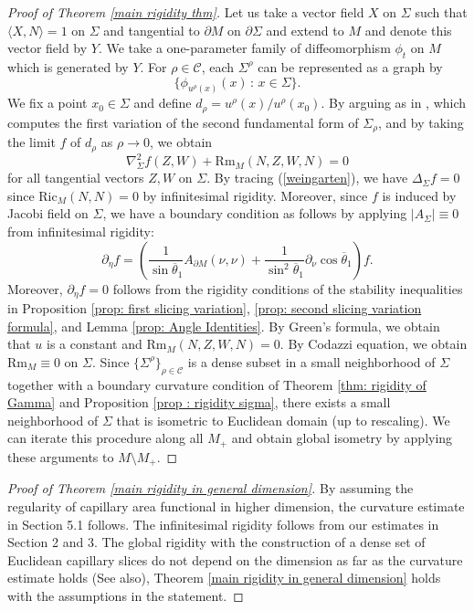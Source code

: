 \documentclass[11pt,letterpaper]{amsart}
\begin{document}
\begin{proof}[Proof of Theorem \ref{main rigidity thm}]
Let us take a vector field $X$ on $\Sigma$ such that $\langle X, N \rangle =1$ on $\Sigma$ and tangential to $\partial M$ on $\partial \Sigma$ and extend to $M$ and denote this vector field by $Y$. We take a one-parameter family of diffeomorphism $\phi_{t}$ on $M$ which is generated by $Y$. For $\rho \in \mathcal{C}$, each $\Sigma^{\rho}$ can be represented as a graph by
\begin{equation*}
    \{ \phi_{u^{\rho}(x)} (x) \, : \, x \in \Sigma\}.
\end{equation*}
We fix a point $x_{0} \in \Sigma$ and define $d_{\rho} = u^{\rho}(x)/ u^{\rho}(x_{0})$. By arguing as in \cite{liu20133}, which computes the first variation of the second fundamental form of $\Sigma_{\rho}$, and by taking the limit $f$ of $d_{\rho}$ as $\rho \rightarrow 0$, we obtain
\begin{equation} \label{weingarten}
    \nabla_{\Sigma}^{2}f(Z,W) + \text{Rm}_{M}(N,Z,W,N)= 0 
\end{equation}
for all tangential vectors $Z, W$ on $\Sigma$. By tracing (\ref{weingarten}), we have $\Delta_{\Sigma} f=0$ since $\text{Ric}_{M}(N,N)=0$ by infinitesimal rigidity. Moreover, since $f$ is induced by Jacobi field on $\Sigma$, we have a boundary condition as follows by applying $|A_{\Sigma}| \equiv 0$ from infinitesimal rigidity:
\begin{equation} \label{Robinboundary}
    \partial_{\eta} f = \left( \frac{1}{\sin \overline{\theta}_1} A_{\partial M} (\nu,\nu) + \frac{1}{\sin^{2} \overline{\theta}_1} \partial_{\nu} \cos \overline{\theta}_1 \right)f.
\end{equation}
Moreover, $\partial_{\eta} f = 0$ follows from the rigidity conditions of the stability inequalities in Proposition \ref{prop: first slicing variation}, \ref{prop: second slicing variation formula}, and Lemma \ref{prop: Angle Identities}. By Green's formula, we obtain that $u$ is a constant and $\text{Rm}_{M}(N,Z,W,N)=0$. By Codazzi equation, we obtain $\text{Rm}_{M} \equiv 0$ on $\Sigma$. Since $\{ \Sigma^{\rho} \}_{\rho \in \mathcal{C}}$ is a dense subset in a small neighborhood of $\Sigma$ together with a boundary curvature condition of Theorem \ref{thm: rigidity of Gamma} and Proposition \ref{prop : rigidity sigma}, there exists a small neighborhood of $\Sigma$ that is isometric to Euclidean domain (up to rescaling). We can iterate this procedure along all $M_{+}$ and obtain global isometry by applying these arguments to $M \setminus M_{+}$.
\end{proof}
\begin{proof}[Proof of Theorem \ref{main rigidity in general dimension}] By assuming the regularity of capillary area functional in higher dimension, the curvature estimate in Section 5.1 follows. The infinitesimal rigidity follows from our estimates in Section 2 and 3. The global rigidity with the construction of a dense set of Euclidean capillary slices do not depend on the dimension as far as the curvature estimate holds (See \cite{li2024dihedral} also), Theorem \ref{main rigidity in general dimension} holds with the assumptions in the statement.
\end{proof}
\end{document}
